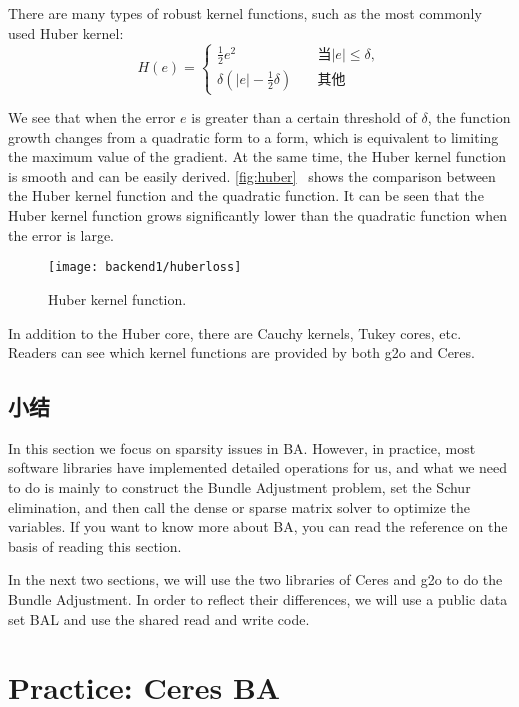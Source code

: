 There are many types of robust kernel functions, such as the most commonly used Huber kernel:
\begin{equation}
H\left( e \right) = 
\left\{ 
\begin{array}{ll}
\frac{1}{2}{e^2} &\quad \text{当} |e| \leqslant \delta, \\
\delta \left( {\left| e \right| - \frac{1}{2}\delta } \right) &\quad \text{其他}
\end{array} \right.
\end{equation}

We see that when the error $e$ is greater than a certain threshold of $\delta$, the function growth changes from a quadratic form to a form, which is equivalent to limiting the maximum value of the gradient. At the same time, the Huber kernel function is smooth and can be easily derived. \autoref{fig:huber}~ shows the comparison between the Huber kernel function and the quadratic function. It can be seen that the Huber kernel function grows significantly lower than the quadratic function when the error is large.

\begin{figure}[!htp]
\centering
\texttt{[image: backend1/huberloss]}
\caption{Huber kernel function. }
\label{fig:huber}
\end{figure}

In addition to the Huber core, there are Cauchy kernels, Tukey cores, etc. Readers can see which kernel functions are provided by both g2o and Ceres.

\subsection{小结}
In this section we focus on sparsity issues in BA. However, in practice, most software libraries have implemented detailed operations for us, and what we need to do is mainly to construct the Bundle Adjustment problem, set the Schur elimination, and then call the dense or sparse matrix solver to optimize the variables. If you want to know more about BA, you can read the \cite{Triggs2000} reference on the basis of reading this section.

In the next two sections, we will use the two libraries of Ceres and g2o to do the Bundle Adjustment. In order to reflect their differences, we will use a public data set BAL\textsubscript{\cite{bundleadjustmentinlarge}} and use the shared read and write code.

\section{Practice: Ceres BA}
